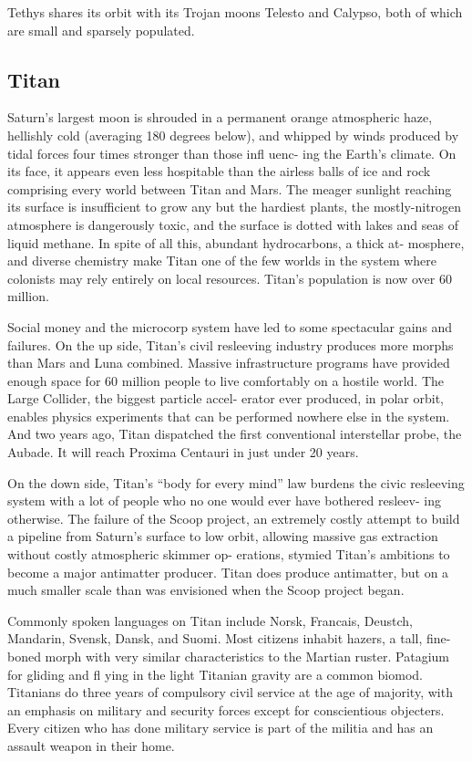 Tethys shares its orbit with its Trojan moons 
Telesto and Calypso, both of which are small and 
sparsely populated.

\subsection{Titan}

Saturn's largest moon is shrouded in a permanent 
orange atmospheric haze, hellishly cold (averaging 
180 degrees below), and whipped by winds produced 
by tidal forces four times stronger than those infl uenc-
ing the Earth's climate. On its face, it appears even 
less hospitable than the airless balls of ice and rock 
comprising every world between Titan and Mars. The 
meager sunlight reaching its surface is insufficient to 
grow any but the hardiest plants, the mostly-nitrogen 
atmosphere is dangerously toxic, and the surface 
is dotted with lakes and seas of liquid methane. In 
spite of all this, abundant hydrocarbons, a thick at-
mosphere, and diverse chemistry make Titan one of 
the few worlds in the system where colonists may rely 
entirely on local resources. Titan's population is now 
over 60 million.

Social money and the microcorp system have led 
to some spectacular gains and failures. On the up 
side, Titan's civil resleeving industry produces more 
morphs than Mars and Luna combined. Massive 
infrastructure programs have provided enough space 
for 60 million people to live comfortably on a hostile 
world. The Large Collider, the biggest particle accel-
erator ever produced, in polar orbit, enables physics 
experiments that can be performed nowhere else in 
the system. And two years ago, Titan dispatched the 
first conventional interstellar probe, the Aubade. It 
will reach Proxima Centauri in just under 20 years.

On the down side, Titan's ``body for every mind'' 
law burdens the civic resleeving system with a lot of 
people who no one would ever have bothered resleev-
ing otherwise. The failure of the Scoop project, an 
extremely costly attempt to build a pipeline from 
Saturn's surface to low orbit, allowing massive gas 
extraction without costly atmospheric skimmer op-
erations, stymied Titan's ambitions to become a major 
antimatter producer. Titan does produce antimatter, 
but on a much smaller scale than was envisioned 
when the Scoop project began.

Commonly spoken languages on Titan include 
Norsk, Francais, Deustch, Mandarin, Svensk, Dansk, 
and Suomi. Most citizens inhabit hazers, a tall, fine-
boned morph with very similar characteristics to 
the Martian ruster. Patagium for gliding and fl ying 
in the light Titanian gravity are a common biomod. 
Titanians do three years of compulsory civil service 
at the age of majority, with an emphasis on military 
and security forces except for conscientious objecters. 
Every citizen who has done military service is part of 
the militia and has an assault weapon in their home.


